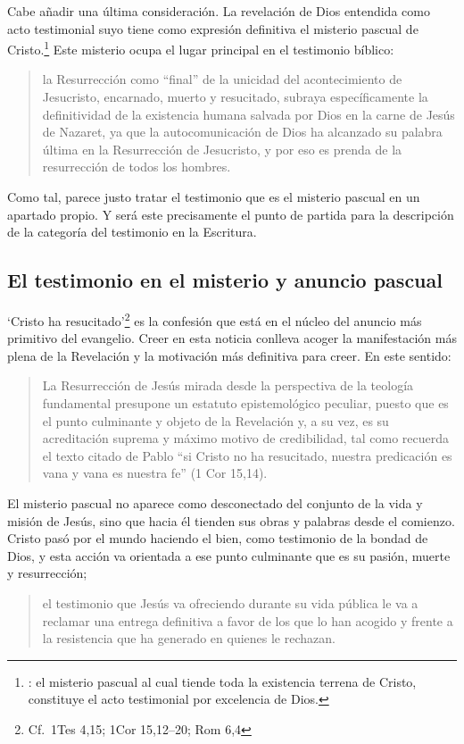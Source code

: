 Cabe añadir una última consideración. La revelación de Dios entendida como acto testimonial suyo tiene como expresión definitiva el misterio pascual de Cristo.\footnote{\cite[128]{prades2015testimonio}: el misterio pascual al cual tiende toda la existencia terrena de Cristo, constituye el acto testimonial por excelencia de Dios.} Este misterio ocupa el lugar principal en el testimonio bíblico: \blockquote[{\cite[404]{ninot2009tf}}]{la Resurrección como ``final'' de la unicidad del acontecimiento de Jesucristo, encarnado, muerto y resucitado, subraya específicamente la definitividad de la existencia humana salvada por Dios en la carne de Jesús de Nazaret, ya que la autocomunicación de Dios ha alcanzado su palabra última en la Resurrección de Jesucristo, y por eso es prenda de la resurrección de todos los hombres.} Como tal, parece justo tratar el testimonio que es el misterio pascual en un apartado propio. Y será este precisamente el punto de partida para la descripción de la categoría del testimonio en la Escritura.

\subsection{El testimonio en el misterio y anuncio pascual}

\enquote*{Cristo ha resucitado}\footnote{Cf.~1Tes 4,15; 1Cor 15,12--20; Rom 6,4} es la confesión que está en el núcleo del anuncio más primitivo del evangelio.\autocite[Cf.][403]{ninot2009tf} Creer en esta noticia conlleva acoger la manifestación más plena de la Revelación y la motivación más definitiva para creer. En este sentido: \blockquote[{\cite[405]{ninot2009tf}}]{La Resurrección de Jesús mirada desde la perspectiva de la teología fundamental presupone un estatuto epistemológico peculiar, puesto que es el punto culminante y objeto de la Revelación y, a su vez, es su acreditación suprema y máximo motivo de credibilidad, tal como recuerda el texto citado de Pablo ``si Cristo no ha resucitado, nuestra predicación es vana y vana es nuestra fe'' (1 Cor 15,14).}

El misterio pascual no aparece como desconectado del conjunto de la vida y misión de Jesús, sino que hacia él tienden sus obras y palabras desde el comienzo. Cristo pasó por el mundo haciendo el bien, como testimonio de la bondad de Dios, y esta acción va orientada a ese punto culminante que es su pasión, muerte y resurrección; \blockquote[{\cite[127]{prades2015testimonio}}]{el testimonio que Jesús va ofreciendo durante su vida pública le va a reclamar una entrega definitiva a favor de los que lo han acogido y frente a la resistencia que ha generado en quienes le rechazan.}

